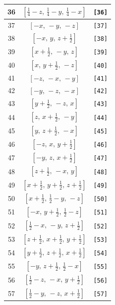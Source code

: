 \documentclass[fleqn,8pt]{jsarticle}
\begin{document}
\begin{longtable}{ccc}
36 & $\left[ \frac{1}{4} - z,\, \frac{1}{4} - y,\, \frac{1}{4} - x \right]$ & {\tt [36]} \\ \hline
37 & $\left[ - x,\, - y,\, - z \right]$ & {\tt [37]} \\ \hline
38 & $\left[ - x,\, y,\, z + \frac{1}{2} \right]$ & {\tt [38]} \\ \hline
39 & $\left[ x + \frac{1}{2},\, - y,\, z \right]$ & {\tt [39]} \\ \hline
40 & $\left[ x,\, y + \frac{1}{2},\, - z \right]$ & {\tt [40]} \\ \hline
41 & $\left[ - z,\, - x,\, - y \right]$ & {\tt [41]} \\ \hline
42 & $\left[ - y,\, - z,\, - x \right]$ & {\tt [42]} \\ \hline
43 & $\left[ y + \frac{1}{2},\, - z,\, x \right]$ & {\tt [43]} \\ \hline
44 & $\left[ z,\, x + \frac{1}{2},\, - y \right]$ & {\tt [44]} \\ \hline
45 & $\left[ y,\, z + \frac{1}{2},\, - x \right]$ & {\tt [45]} \\ \hline
46 & $\left[ - z,\, x,\, y + \frac{1}{2} \right]$ & {\tt [46]} \\ \hline
47 & $\left[ - y,\, z,\, x + \frac{1}{2} \right]$ & {\tt [47]} \\ \hline
48 & $\left[ z + \frac{1}{2},\, - x,\, y \right]$ & {\tt [48]} \\ \hline
49 & $\left[ x + \frac{1}{2},\, y + \frac{1}{2},\, z + \frac{1}{2} \right]$ & {\tt [49]} \\ \hline
50 & $\left[ x + \frac{1}{2},\, \frac{1}{2} - y,\, - z \right]$ & {\tt [50]} \\ \hline
51 & $\left[ - x,\, y + \frac{1}{2},\, \frac{1}{2} - z \right]$ & {\tt [51]} \\ \hline
52 & $\left[ \frac{1}{2} - x,\, - y,\, z + \frac{1}{2} \right]$ & {\tt [52]} \\ \hline
53 & $\left[ z + \frac{1}{2},\, x + \frac{1}{2},\, y + \frac{1}{2} \right]$ & {\tt [53]} \\ \hline
54 & $\left[ y + \frac{1}{2},\, z + \frac{1}{2},\, x + \frac{1}{2} \right]$ & {\tt [54]} \\ \hline
55 & $\left[ - y,\, z + \frac{1}{2},\, \frac{1}{2} - x \right]$ & {\tt [55]} \\ \hline
56 & $\left[ \frac{1}{2} - z,\, - x,\, y + \frac{1}{2} \right]$ & {\tt [56]} \\ \hline
57 & $\left[ \frac{1}{2} - y,\, - z,\, x + \frac{1}{2} \right]$ & {\tt [57]} \\ \hline

\end{longtable}
\end{document}

